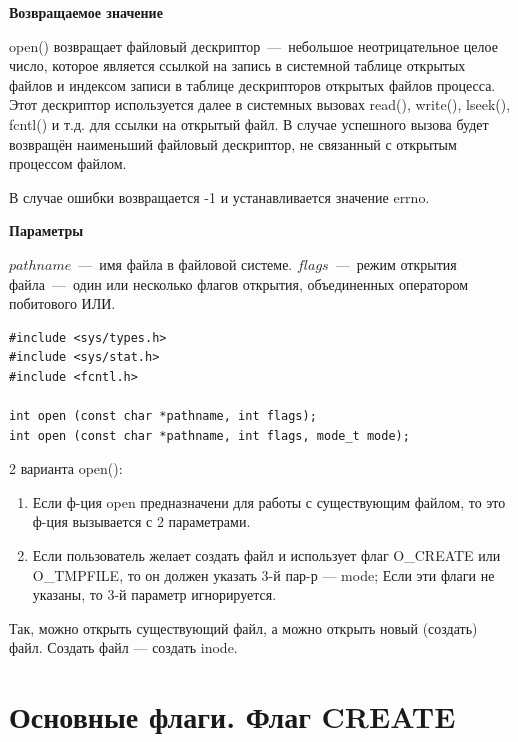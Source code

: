 \textbf{Возвращаемое значение}

open() возвращает файловый дескриптор~---~небольшое неотрицательное целое число, которое является ссылкой на запись в системной таблице открытых файлов и индексом записи в таблице дескрипторов открытых файлов процесса. Этот дескриптор используется далее в системных вызовах read(), write(), lseek(), fcntl() и т.д. для ссылки на открытый файл. В случае успешного вызова будет возвращён наименьший файловый дескриптор, не связанный с открытым процессом файлом.

В случае ошибки возвращается -1 и устанавливается значение errno.

\textbf{Параметры}

$pathname$~---~имя файла в файловой системе. $flags$~---~режим открытия файла~---~один или несколько флагов открытия, объединенных оператором побитового ИЛИ. 

\begin{lstlisting}
#include <sys/types.h>
#include <sys/stat.h>
#include <fcntl.h>

int open (const char *pathname, int flags);
int open (const char *pathname, int flags, mode_t mode);
\end{lstlisting}

2 варианта open():
\begin{enumerate}
    \item Если ф-ция open предназначени для работы с существующим файлом, то это ф-ция вызывается с 2 параметрами.
    \item Если пользователь желает создать файл и использует флаг O\_CREATE или O\_TMPFILE, то он должен указать 3-й пар-р --- mode; Если эти флаги не указаны, то 3-й параметр игнорируется.
\end{enumerate}

Так, можно открыть существующий файл, а можно открыть новый (создать) файл. Создать файл --- создать inode.


\section{Основные флаги. Флаг CREATE}

